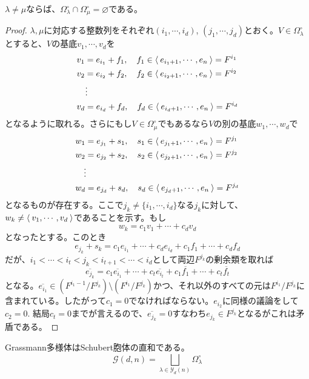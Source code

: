 \documentclass{ltjsreport}
\begin{document}
\begin{prop}
  $\lambda\neq\mu$ならば、$\Omega_\lambda^\circ\cap\Omega_\mu^\circ=\varnothing$である。
\end{prop}

\begin{proof}
  $\lambda,\mu$に対応する整数列をそれぞれ$(i_1,\cdots,i_d)$, $(j_1,\cdots,j_d)$とおく。$V\in\Omega_\lambda^\circ$とすると、$V$の基底$v_1,\cdots,v_d$を
  \begin{align*}
    &v_1=e_{i_1}+f_1,\quad f_1\in\langle\:e_{i_1+1},\cdots,e_n\:\rangle=F^{i_1}\\
    &v_2=e_{i_2}+f_2,\quad f_2\in\langle\:e_{i_2+1},\cdots,e_n\:\rangle=F^{i_2}\\
    &\quad\vdots\\
    &v_d=e_{i_d}+f_d,\quad f_d\in\langle\:e_{i_d+1},\cdots,e_n\:\rangle=F^{i_d}
  \end{align*}
  となるように取れる。さらにもし$V\in\Omega_{\mu}^\circ$でもあるなら$V$の別の基底$w_1,\cdots,w_d$で
  \begin{align*}
    &w_1=e_{j_1}+s_1,\quad s_1\in\langle\:e_{j_1+1},\cdots,e_n\:\rangle=F^{j_1}\\
    &w_2=e_{j_2}+s_2,\quad s_2\in\langle\:e_{j_2+1},\cdots,e_n\:\rangle=F^{j_2}\\
    &\quad\vdots\\
    &w_d=e_{j_d}+s_d,\quad s_d\in\langle\:e_{j_d+1},\cdots,e_n\:\rangle=F^{j_d}
  \end{align*}
  となるものが存在する。ここで$j_k\neq\{i_1,\cdots,i_d\}$なる$j_k$に対して、$w_{k}\neq\langle\:v_1,\cdots,v_d\:\rangle$であることを示す。もし
  \[
  w_k=c_1v_1+\cdots+c_dv_d  
  \]
  となったとする。このとき
  \[
  e_{j_k}+s_k=c_1e_{i_1}+\cdots+c_de_{i_d}+c_1f_1+\cdots+c_df_d  
  \]
  だが、$i_1<\cdots<i_{t}<j_k<i_{t+1}<\cdots<i_d$として両辺$F^{j_k}$の剰余類を取れば
  \[
  \overline{e_{j_k}}=c_1\overline{e_{i_1}}+\cdots+c_t\overline{e_{i_t}}+c_1\overline{f_1}+\cdots+c_t\overline{f_t}  
  \]
  となる。$\overline{e_{i_1}}\in (F^{i_1-1}/F^{j_k})\setminus (F^{i_1}/F^{j_k})$かつ、それ以外のすべての元は$F^{i_1}/F^{j_k}$に含まれている。したがって$c_1=0$でなければならない。$e_{i_2}$に同様の議論をして$c_2=0$. 結局$c_t=0$までが言えるので、$\overline{e_{j_k}}=0$すなわち$e_{j_k}\in F^{j_k}$となるがこれは矛盾である。
\end{proof}

\begin{cor}
  Grassmann多様体はSchubert胞体の直和である。
  \[
    \mathcal{G}(d,n)=\bigsqcup_{\lambda\in\mathcal{Y}_d(n)}\Omega_{\lambda}^\circ
  \]
\end{cor}
\end{document}
